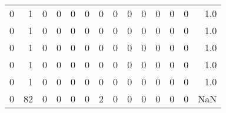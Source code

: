 \begin{tabular}{rrrrrrrrrrrrrr}
       0 &       1 &          0 &               0 &                0 &       0 &          0 &          0 &         0 &         0 &      0 &             0 &         0 &      1.0 \\
       0 &       1 &          0 &               0 &                0 &       0 &          0 &          0 &         0 &         0 &      0 &             0 &         0 &      1.0 \\
       0 &       1 &          0 &               0 &                0 &       0 &          0 &          0 &         0 &         0 &      0 &             0 &         0 &      1.0 \\
       0 &       1 &          0 &               0 &                0 &       0 &          0 &          0 &         0 &         0 &      0 &             0 &         0 &      1.0 \\
       0 &       1 &          0 &               0 &                0 &       0 &          0 &          0 &         0 &         0 &      0 &             0 &         0 &      1.0 \\
       0 &      82 &          0 &               0 &                0 &       0 &          2 &          0 &         0 &         0 &      0 &             0 &         0 &      NaN \\
\bottomrule
\end{tabular}
